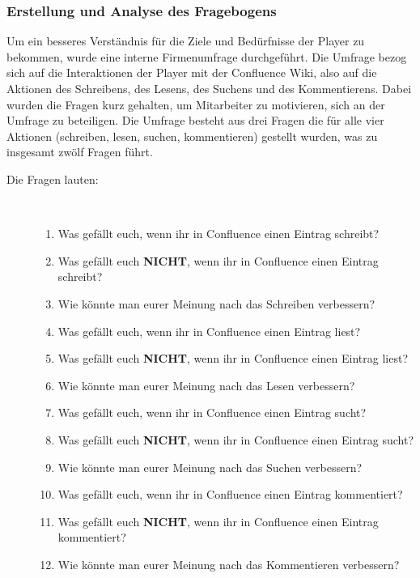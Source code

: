 \documentclass[a4paper,12pt,twoside]{scrartcl}
\begin{document}
\subsubsection{Erstellung und Analyse des Fragebogens}
\label{Fragebogen}
Um ein besseres Verständnis für die Ziele und Bedürfnisse der Player zu bekommen, wurde eine interne Firmenumfrage durchgeführt. Die Umfrage bezog sich auf die Interaktionen der Player mit der Confluence Wiki, also auf die Aktionen des Schreibens, des Lesens, des Suchens und des Kommentierens. Dabei wurden die Fragen kurz gehalten, um Mitarbeiter zu motivieren, sich an der Umfrage zu beteiligen. Die Umfrage besteht aus drei Fragen die für alle vier Aktionen (schreiben, lesen, suchen, kommentieren) gestellt wurden, was zu insgesamt zwölf Fragen führt.
\begin{description}
   \item[Die Fragen lauten:]~\par
   \begin{enumerate}
      \item Was gefällt euch, wenn ihr in Confluence einen Eintrag schreibt?
      \item Was gefällt euch \textbf{NICHT}, wenn ihr in Confluence einen Eintrag schreibt?
      \item Wie könnte man eurer Meinung nach das Schreiben verbessern?
      
      \item Was gefällt euch, wenn ihr in Confluence einen Eintrag liest?
      \item Was gefällt euch \textbf{NICHT}, wenn ihr in Confluence einen Eintrag liest?
      \item Wie könnte man eurer Meinung nach das Lesen verbessern?
      
      \item Was gefällt euch, wenn ihr in Confluence einen Eintrag sucht?
      \item Was gefällt euch \textbf{NICHT}, wenn ihr in Confluence einen Eintrag sucht?
      \item Wie könnte man eurer Meinung nach das Suchen verbessern?
      
      \item Was gefällt euch, wenn ihr in Confluence einen Eintrag kommentiert?
      \item Was gefällt euch \textbf{NICHT}, wenn ihr in Confluence einen Eintrag kommentiert?
      \item Wie könnte man eurer Meinung nach das Kommentieren verbessern?
   \end{enumerate}
\end{description}
\end{document}
